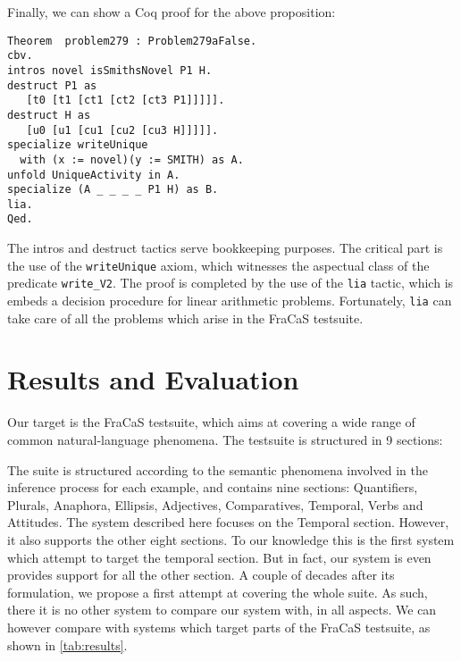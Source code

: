 \documentclass[a4paper,11pt]{article}
\begin{document}
{Finally, we can show a Coq proof for the above proposition:
\begin{verbatim}
Theorem  problem279 : Problem279aFalse.
cbv.
intros novel isSmithsNovel P1 H.
destruct P1 as
   [t0 [t1 [ct1 [ct2 [ct3 P1]]]]].
destruct H as
   [u0 [u1 [cu1 [cu2 [cu3 H]]]]].
specialize writeUnique
  with (x := novel)(y := SMITH) as A.
unfold UniqueActivity in A.
specialize (A _ _ _ _ P1 H) as B.
lia.
Qed.
\end{verbatim}
}

The intros and destruct tactics serve bookkeeping purposes. The
critical part is the use of the \texttt{writeUnique} axiom, which
witnesses the aspectual class of the predicate \texttt{write\_V2}.
The proof is completed by the use of the \texttt{lia} tactic, which is
embeds a decision procedure for linear arithmetic
problems. Fortunately, \texttt{lia} can take care of all the problems
which arise in the FraCaS testsuite.

\section{Results and Evaluation}
\label{sec:results}
Our target is the FraCaS testsuite, which aims at covering a wide
range of common natural-language phenomena. The testsuite is structured in 9 sections:

The suite is structured according to the semantic phenomena involved
in the inference process for each example, and contains nine sections:
Quantifiers, Plurals, Anaphora, Ellipsis, Adjectives, Comparatives,
Temporal, Verbs and Attitudes.  The system described here focuses on
the Temporal section. However, it also supports the other eight
sections.  To our knowledge this is the first system which attempt to
target the temporal section. But in fact, our system is even provides
support for all the other section. A couple of decades after its
formulation, we propose a first attempt at covering the whole suite.
As such, there it is no other system to compare our system with, in
all aspects.  We can however compare with systems which target parts
of the FraCaS testsuite, as shown in \cref{tab:results}.
\end{document}
